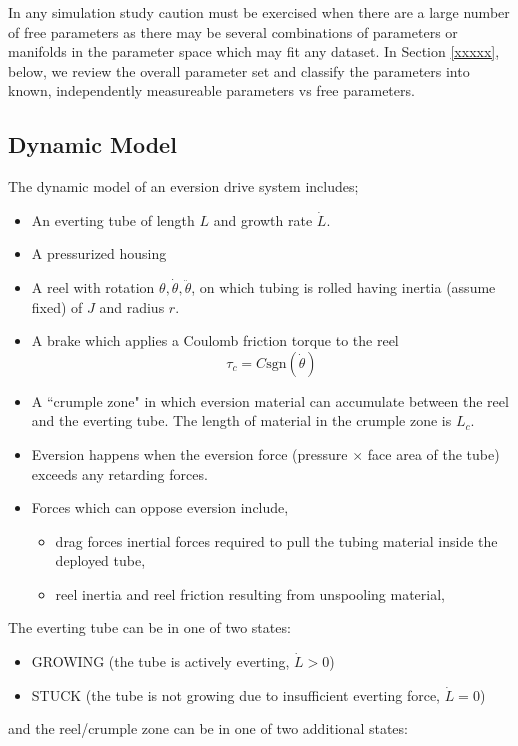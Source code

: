 \documentclass[letterpaper]{article}
\begin{document}
In any simulation study caution must be exercised when there are a large number of free parameters
as there may be several combinations of parameters or manifolds in the parameter space which
may fit any dataset.   In Section \ref{xxxxx}, below, we review the overall parameter set and
classify the parameters into known, independently measureable parameters vs free parameters.


\subsection{Dynamic Model}
The dynamic model of an eversion drive system includes;
\begin{itemize}
  \item An everting tube of length $L$ and growth rate $\dot{L}$.
  \item A pressurized housing
  \item A reel with rotation $\theta, \dot{\theta}, \ddot{\theta}$, on which tubing is rolled having inertia (assume fixed) of
  $J$ and radius $r$.
  \item A brake which applies a Coulomb friction torque to the reel
  \[
    \tau_c = C\mathrm{sgn}(\dot{\theta})
  \]
  \item A ``crumple zone" in which eversion material can accumulate
  between the reel and the everting tube. The length of material in
  the crumple zone is $L_c$.
  \item Eversion happens when the eversion force (pressure $\times$ face area of the tube) exceeds any retarding forces.
  \item Forces which can oppose eversion include,
  \begin{itemize}
    \item drag forces inertial forces required to pull the tubing material
    inside the deployed tube,
    \item reel inertia and reel friction resulting from unspooling material,
  \end{itemize}
\end{itemize}

\noindent
The everting tube can be in one of two states:
\begin{itemize}
  \item GROWING (the tube is actively everting, $\dot{L}>0$)
  \item STUCK (the tube is not growing due to insufficient everting force, $\dot{L}=0$)
\end{itemize}
and the reel/crumple zone can be in one of two additional states:
\end{document}
